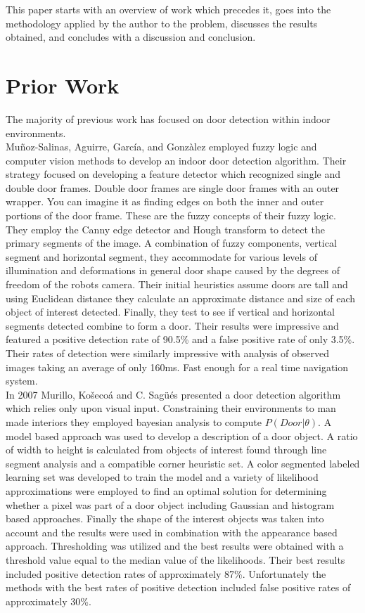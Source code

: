 \documentclass[twocolumn,nofootinbib,%
notitlepage,10pt]{report}
\begin{document}
\indent This paper starts with an overview of work which precedes it, goes into the methodology applied by the author to the problem, discusses the results obtained, and concludes with a discussion and conclusion.

\section{Prior Work}
The majority of previous work has focused on door detection within indoor environments.\\
\indent Mu{\~n}oz-Salinas, Aguirre, Garc{\'i}a, and Gonz{\`a}lez \cite{wseas} employed fuzzy logic and computer vision methods to develop an indoor door detection algorithm. Their strategy focused on developing a feature detector which recognized single and double door frames. Double door frames are single door frames with an outer wrapper. You can imagine it as finding edges on both the inner and outer portions of the door frame. These are the fuzzy concepts of their fuzzy logic. They employ the Canny edge detector and Hough transform to detect the primary segments of the image. A combination of fuzzy components, vertical segment and horizontal segment, they accommodate for various levels of illumination and deformations in general door shape caused by the degrees of freedom of the robots camera. Their initial heuristics assume doors are tall and using Euclidean distance they calculate an approximate distance and size of each object of interest detected. Finally, they test to see if vertical and horizontal segments detected combine to form a door. Their results were impressive and featured a positive detection rate of 90.5\% and a false positive rate of only 3.5\%. Their rates of detection were similarly impressive with analysis of observed images taking an average of only 160ms. Fast enough for a real time navigation system.\\
\indent In 2007 Murillo, Ko{\v s}eco{\' a} and C. Sag{\" u}{\' e}s \cite{murillo} presented a door detection algorithm which relies only upon visual input. Constraining their environments to man made interiors they employed bayesian analysis to compute $P(Door|\theta)$. A model based approach was used to develop a description of a door object. A ratio of width to height is calculated from objects of interest found through line segment analysis and a compatible corner heuristic set. A color segmented labeled learning set was developed to train the model and a variety of likelihood approximations were employed to find an optimal solution for determining whether a pixel was part of a door object including Gaussian and histogram based approaches. Finally the shape of the interest objects was taken into account and the results were used in combination with the appearance based approach. Thresholding was utilized and the best results were obtained with a threshold value equal to the median value of the likelihoods. Their best results included positive detection rates of approximately 87\%. Unfortunately the methods with the best rates of positive detection included false positive rates of approximately 30\%.\\
\end{document}
